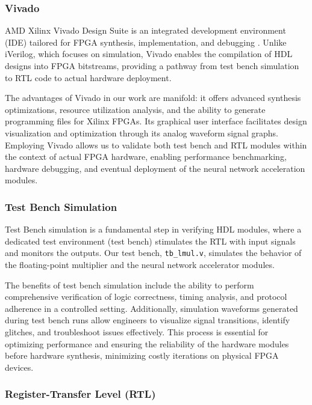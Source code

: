 \documentclass[12pt,letterpaper]{article}
\begin{document}
\subsubsection{Vivado}

AMD Xilinx Vivado Design Suite is an integrated development environment (IDE) tailored for FPGA synthesis, implementation, and debugging \cite{vivado}. Unlike iVerilog, which focuses on simulation, Vivado enables the compilation of HDL designs into FPGA bitstreams, providing a pathway from test bench simulation to RTL code to actual hardware deployment.

The advantages of Vivado in our work are manifold: it offers advanced synthesis optimizations, resource utilization analysis, and the ability to generate programming files for Xilinx FPGAs. Its graphical user interface facilitates design visualization and optimization through its analog waveform signal graphs. Employing Vivado allows us to validate both test bench and RTL modules within the context of actual FPGA hardware, enabling performance benchmarking, hardware debugging, and eventual deployment of the neural network acceleration modules.

\subsubsection{Test Bench Simulation}

Test Bench simulation is a fundamental step in verifying HDL modules, where a dedicated test environment (test bench) stimulates the RTL with input signals and monitors the outputs. Our test bench, \texttt{tb\_lmul.v}, simulates the behavior of the floating-point multiplier and the neural network accelerator modules.

The benefits of test bench simulation include the ability to perform comprehensive verification of logic correctness, timing analysis, and protocol adherence in a controlled setting. Additionally, simulation waveforms generated during test bench runs allow engineers to visualize signal transitions, identify glitches, and troubleshoot issues effectively. This process is essential for optimizing performance and ensuring the reliability of the hardware modules before hardware synthesis, minimizing costly iterations on physical FPGA devices.

\subsubsection{Register-Transfer Level (RTL)}
\end{document}
